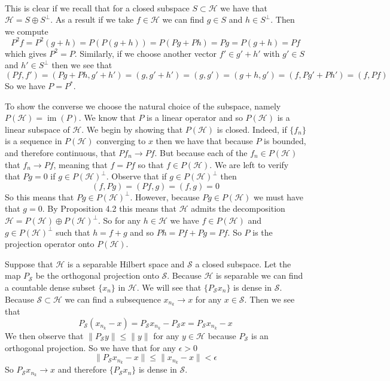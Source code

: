 \documentclass{article}
\newcommand{\problem}[1]{\noindent{\textbf{Problem #1}}\\}
\newcommand{\problempart}[1]{\noindent{\textbf{(#1)}}}
\newcommand{\norm}[1]{\|#1\|}
\DeclareMathOperator{\im}{\text{im}}
\begin{document}
\problem{4.7.11}
\problempart{a} This is clear if we recall that for a closed subspace $S \subset \mathcal{H}$ we have that $\mathcal{H} = S \oplus S^\perp$. As a result if we take $f \in \mathcal{H}$ we can find $g \in S$ and $h \in S^\perp$. Then we compute
\[
P^2f= P^2(g + h) = P(P(g+h)) = P(Pg + Ph) = Pg = P(g + h) = Pf
\]
which gives $P^2 = P$. Similarly, if we choose another vector $f' \in g' + h'$ with $g' \in S$ and $h' \in S^\perp$ then we see that 
\[
(Pf, f') = (Pg + Ph, g' + h') = (g, g' + h') = (g,g') = (g + h, g') = (f, Pg' + Ph') = (f, Pf)
\]
So we have $P = P^*$.

\problempart{b} To show the converse we choose the natural choice of the subspace, namely $P(\mathcal{H}) = \im(P)$. We know that $P$ is a linear operator and so $P(\mathcal{H})$ is a linear subspace of $\mathcal{H}$. We begin by showing that $P(\mathcal{H})$ is closed. Indeed, if $\{f_n\}$ is a sequence in $P(\mathcal{H})$ converging to $x$ then we have that because $P$ is bounded, and therefore continuous, that $Pf_n \to Pf$. But because each of the $f_n \in P(\mathcal{H})$ that $f_n \to Pf$, meaning that $f = Pf$ so that $f \in P(\mathcal{H})$. We are left to verify that $Pg = 0$ if $g \in P(\mathcal{H})^\perp$. Observe that if $g \in P(\mathcal{H})^\perp$ then 
\[
(f, Pg) = (Pf, g) = (f,g) = 0
\]
So this means that $Pg \in P(\mathcal{H})^\perp$. However, because $Pg \in P(\mathcal{H})$ we must have that $g = 0$. By Proposition 4.2 this means that $\mathcal{H}$ admits the decomposition $\mathcal{H} = P(\mathcal{H}) \oplus P(\mathcal{H})^\perp$. So for any $h \in \mathcal{H}$ we have $f \in P(\mathcal{H})$ and $g \in P(\mathcal{H})^\perp$ such that $h = f + g$ and so $Ph = Pf + Pg = Pf$. So $P$ is the projection operator onto $P(\mathcal{H})$. 

\problempart{c} Suppose that $\mathcal{H}$ is a separable Hilbert space and $\mathcal{S}$ a closed subspace. Let the map $P_\mathcal{S}$ be the orthogonal projection onto $\mathcal{S}$. Because $\mathcal{H}$ is separable we can find a countable dense subset $\{x_n\}$ in $\mathcal{H}$. We will see that $\{P_\mathcal{S}x_n\}$ is dense in $\mathcal{S}$. Because $\mathcal{S} \subset \mathcal{H}$ we can find a subsequence $x_{n_k} \to x$ for any $x \in \mathcal{S}$. Then we see that 
\[
P_\mathcal{S}(x_{n_k} - x) = P_\mathcal{S}x_{n_k} - P_\mathcal{S}x = P_\mathcal{S}x_{n_k} - x
\]
We then observe that $\norm{P_\mathcal{S}y} \leq \norm{y}$ for any $y \in \mathcal{H}$ because $P_\mathcal{S}$ is an orthogonal projection. So we have that for any $\epsilon > 0$
\[
\norm{P_\mathcal{S}x_{n_k} - x} \leq \norm{x_{n_k} - x} < \epsilon
\]
So $P_\mathcal{S}x_{n_k} \to x$ and therefore $\{P_\mathcal{S}x_n\}$ is dense in $\mathcal{S}$.
\end{document}
